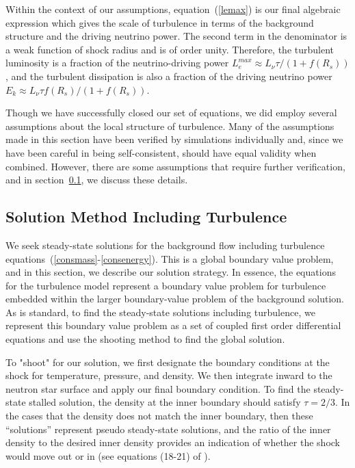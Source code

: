 \documentclass[twocolumn]{aastex6}
\begin{document}
Within the context of our assumptions, equation~(\ref{lemax}) is our
final algebraic expression which gives the scale of turbulence in
terms of the background structure and the driving neutrino power.  The
second term in the denominator is a weak function of shock radius and
is of order unity.  Therefore, the turbulent luminosity is a fraction
of the neutrino-driving power $L_{e}^{max} \approx L_{\nu} \tau / (1 +
f(R_s))$, and the turbulent dissipation is also a fraction of the
driving neutrino power $E_k \approx L_{\nu} \tau f(R_s)/ (1 +
f(R_s))$.

Though we have successfully closed our set of equations, we did employ
several assumptions about the local structure of turbulence. Many of the assumptions made in this section have been
verified by simulations individually \citep{murphy13} and, since we
have been careful in being self-consistent, should have equal validity
when combined. However, there are some assumptions that require
further verification, and in section~\ref{turbmethod}, we discuss
these details.

\subsection{Solution Method Including Turbulence}
\label{turbmethod}

We seek steady-state solutions for the background flow including turbulence equations~(\ref{consmass}-\ref{consenergy}).  
   This is a global boundary value problem, and
  in this section, we describe our solution strategy.  In essence, the
equations for the turbulence model represent a boundary value problem
for turbulence
embedded within the larger boundary-value problem of the background
solution.  As is standard, to find the steady-state solutions
including turbulence, we represent this boundary value problem as a set
of coupled first order differential equations and use the shooting method
to find the global solution.

To "shoot" for our solution, we first designate the boundary
conditions at the shock for temperature, pressure, and density.  We then integrate inward to the neutron star surface and apply our final boundary condition.  To find the
  steady-state stalled solution, the density at the inner boundary
  should satisfy $\tau = 2/3$.  In the cases that the density does
  not match the inner boundary, then these ``solutions'' represent
  pseudo steady-state solutions, and the ratio of the inner density to
  the desired inner density provides an indication of whether the
  shock would move out or in (see equations (18-21) of \citet{murphy17}).
  
\end{document}
